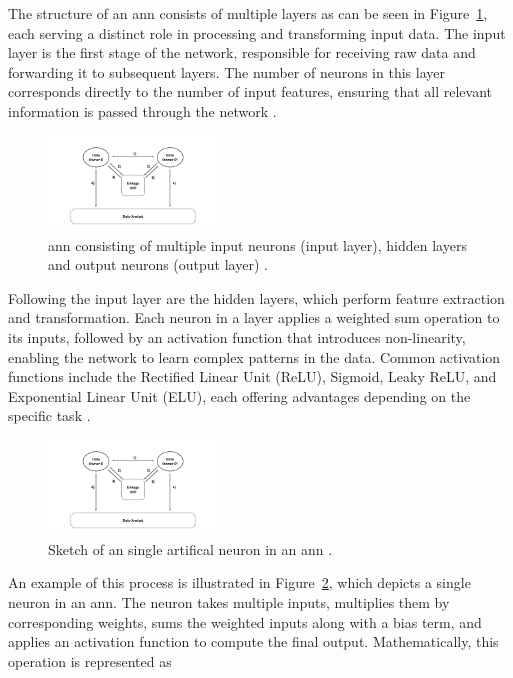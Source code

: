 The structure of an \ac{ann} consists of multiple layers as can be seen in Figure~\ref{fig:annexample}, each serving a distinct role in processing and transforming input data.
The input layer is the first stage of the network, responsible for receiving raw data and forwarding it to subsequent layers.
The number of neurons in this layer corresponds directly to the number of input features, ensuring that all relevant information is passed through the network \cite{dongare2012introduction, sharma2024deep}.

\begin{figure}[H]
  \centering
  \includegraphics[width=0.4\textwidth, page=16]{img/visualization.pdf}
  \caption{\ac{ann} consisting of multiple input neurons (input layer), hidden layers and output neurons (output layer) \cite{annimage}.}
  \label{fig:annexample}
\end{figure}


Following the input layer are the hidden layers, which perform feature extraction and transformation.
Each neuron in a layer applies a weighted sum operation to its inputs, followed by an activation function that introduces non-linearity, enabling the network to learn complex patterns in the data. Common activation functions include the Rectified Linear Unit (ReLU), Sigmoid, Leaky ReLU, and Exponential Linear Unit (ELU), each offering advantages depending on the specific task \cite{sharma2017activation,russell2016artificial}.

\begin{figure}[H]
  \centering
  \includegraphics[width=0.4\textwidth, page=17]{img/visualization.pdf}
  \caption{Sketch of an single artifical neuron in an \ac{ann} \cite{neuronimage}.}
  \label{fig:neuronexample}
\end{figure}

An example of this process is illustrated in Figure~\ref{fig:neuronexample}, which depicts a single neuron in an \ac{ann}.
The neuron takes multiple inputs, multiplies them by corresponding weights, sums the weighted inputs along with a bias term, and applies an activation function to compute the final output.
Mathematically, this operation is represented as

